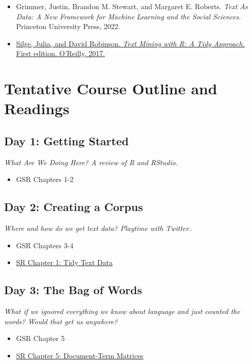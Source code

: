 \documentclass[11pt, letterpaper]{article}
\begin{document}
\begin{itemize}
\item Grimmer, Justin, Brandon M. Stewart, and Margaret E. Roberts. \textit{Text As Data: A New Framework for Machine Learning and the Social Sciences.} Princeton University Press, 2022.
\item \href{https://www.tidytextmining.com/index.html}{Silge, Julia, and David Robinson. \textit{Text Mining with R: A Tidy Approach.} First edition. O’Reilly, 2017.}
\end{itemize} 



\section*{Tentative Course Outline and Readings}

\subsection*{Day 1: Getting Started}

\textit{What Are We Doing Here? A review of R and RStudio.}

\begin{itemize}
	\item GSR Chapters 1-2
\end{itemize}

\subsection*{Day 2: Creating a Corpus}

\textit{Where and how do we get text data? Playtime with Twitter.}

\begin{itemize}
	\item GSR Chapters 3-4
	\item \href{https://www.tidytextmining.com/tidytext.html}{SR Chapter 1: Tidy Text Data}
\end{itemize}

\subsection*{Day 3: The Bag of Words}

\textit{What if we ignored everything we know about language and just counted the words? Would that get us anywhere?}

\begin{itemize}
	\item GSR Chapter 5
	\item \href{https://www.tidytextmining.com/dtm.html}{SR Chapter 5: Document-Term Matrices}
\end{itemize}
\end{document}
